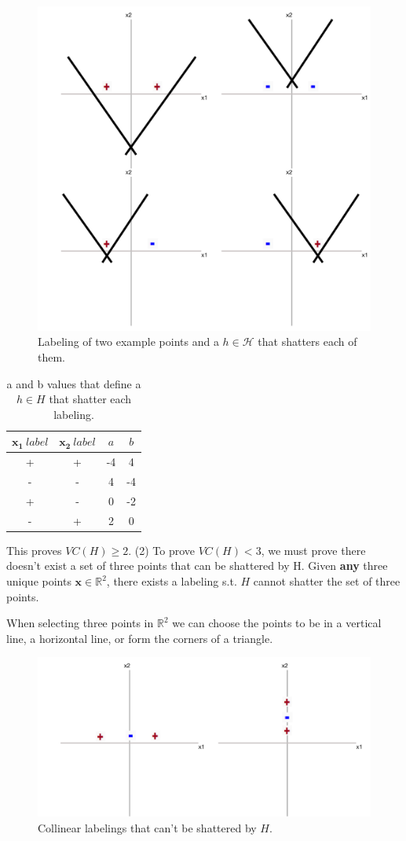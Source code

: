 \documentclass[11pt]{article}
\begin{document}
\begin{figure}[H]
  \centerline{\includegraphics[width=0.5\linewidth]{image_2_4_1.png}}
  \caption{Labeling of two example points and a $h \in \mathcal{H}$ that shatters each of them.}
\end{figure}

 \begin{table}[H]
\centering
{\renewcommand{\arraystretch}{1.2}%
\begin{tabular}{| c | c | c | c |}
\hline
$\mathbf{x_1} \ label$& $\mathbf{x_2} \ label$ & $a$ & $b$\\
\hline
+ & + & -4 & 4\\ \hline
- & - & 4 & -4\\ \hline
+ & - & 0& -2 \\ \hline
- & + & 2 & 0\\ \hline
\end{tabular}}
\caption{a and b values that define a $h \in H$ that shatter each labeling.}
\end{table}

This proves $VC(H) \geq 2$. (2) To prove $VC(H) < 3$, we must prove there doesn't exist a set of three points that can be shattered by H. Given \textbf{any} three unique points $\mathbf{x} \in \mathbb{R}^2$, there exists a labeling s.t. $H$ cannot shatter the set of three points.

When selecting three points in $\mathbb{R}^2$ we can choose the points to be in a vertical line, a horizontal line, or form the corners of a triangle.

\begin{figure}[H]
  \centerline{\includegraphics[width=0.5\linewidth]{image_2_4_2.png}}
  \caption{Collinear labelings that can't be shattered by $H$.}
\end{figure}
\end{document}
